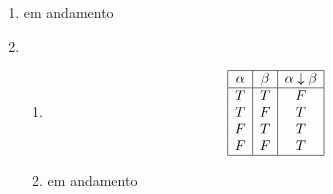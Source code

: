 \begin{enumerate}
\begin{enumerate}
		\end{enumerate}
	\item em andamento
	\item
		\begin{enumerate}
			\item 
			\[\begin{array}{|c|c|c|}
				\hline
				\alpha & \beta & \alpha\downarrow\beta  \\ \hline
				T & T & F  \\
				T & F & T  \\
				F & T & T  \\
				F & F & T  \\
				\hline
			\end{array}
			\]
			\item em andamento
		\end{enumerate}

\end{enumerate}

